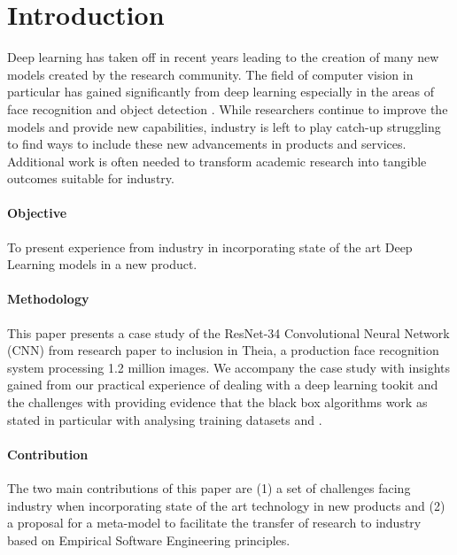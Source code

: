 \section{Introduction}

Deep learning has taken off in recent years leading to the creation of many new models created by the research community. The field of computer vision in particular has gained significantly from deep learning \citep{He:2016ib,Jia:2014cm} especially in the areas of face recognition \citep{Schroff:2015ks} and object detection \citep{Huang:2017wn}. While researchers continue to improve the models and provide new capabilities, industry is left to play catch-up struggling to find ways to include these new advancements in products and services. Additional work is often needed to transform academic research into tangible outcomes suitable for industry.

\paragraph{Objective} To present experience from industry in incorporating state of the art Deep Learning models in a new product.

\paragraph{Methodology} This paper presents a case study of the ResNet-34 Convolutional Neural Network  (CNN) from research paper to inclusion in Theia, a production face recognition system processing 1.2 million images. We accompany the case study with insights gained from our practical experience of dealing with a deep learning tookit \citep{King:2009wp} and the challenges with providing evidence that the black box algorithms work as stated in particular with analysing training datasets \citep{Parkhi:2015de} and \citep{Ng:2014wa}.
 
 \paragraph{Contribution} The two main contributions of this paper are (1) a set of challenges facing industry when incorporating state of the art technology in new products and (2) a proposal for a meta-model to facilitate the transfer of research to industry based on Empirical Software Engineering principles.
 
